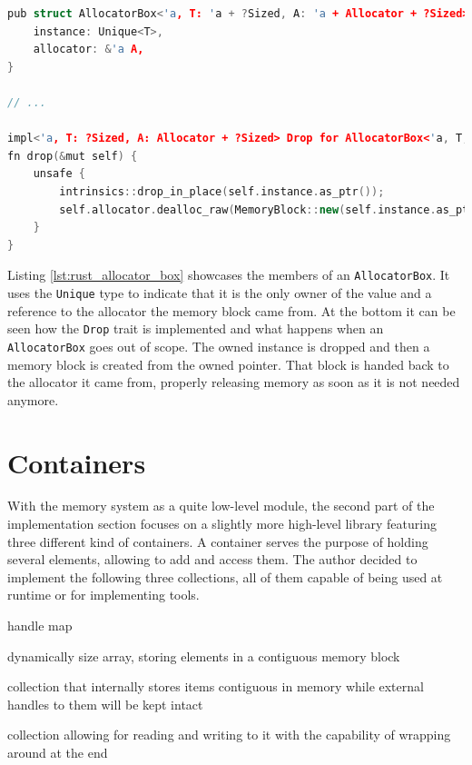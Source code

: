 \begin{lstlisting}[caption={AllocatorBox abstraction to allow \ac{RAII} management of allocations.}, label={lst:rust_allocator_box}, language={C++}]
pub struct AllocatorBox<'a, T: 'a + ?Sized, A: 'a + Allocator + ?Sized> {
	instance: Unique<T>,
	allocator: &'a A,
}

// ...

impl<'a, T: ?Sized, A: Allocator + ?Sized> Drop for AllocatorBox<'a, T, A> {
fn drop(&mut self) {
	unsafe {
		intrinsics::drop_in_place(self.instance.as_ptr());
		self.allocator.dealloc_raw(MemoryBlock::new(self.instance.as_ptr() as *mut u8));
	}
}

\end{lstlisting}

\noindent
Listing \ref{lst:rust_allocator_box} showcases the members of an \texttt{AllocatorBox}. It uses the \texttt{Unique} type to indicate that it is the only owner of the value and a reference to the allocator the memory block came from. At the bottom it can be seen how the \texttt{Drop} trait is implemented and what happens when an \texttt{AllocatorBox} goes out of scope. The owned instance is dropped and then a memory block is created from the owned pointer. That block is handed back to the allocator it came from, properly releasing memory as soon as it is not needed anymore. 

\newpage

\section{Containers} \label{container_impl}

With the memory system as a quite low-level module, the second part of the implementation section focuses on a slightly more high-level library featuring three different kind of containers. A container serves the purpose of holding several elements, allowing to add and access them. The author decided to implement the following three collections, all of them capable of being used at runtime or for implementing tools.

\begin{labeling}{handle map}
	\item [vector] dynamically size array, storing elements in a contiguous memory block
	\item [handle map] collection that internally stores items contiguous in memory 
	while external handles to them will be kept intact
	\item [ringbuffer] collection allowing for reading and writing to it
	with the capability of wrapping around at the end
\end{labeling}

